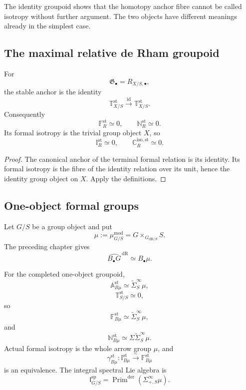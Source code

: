 \begin{remark}
The identity groupoid shows that the homotopy anchor fibre cannot be called
isotropy without further argument.  The two objects have different meanings
already in the simplest case.
\end{remark}

\subsection{The maximal relative de Rham groupoid}

\begin{proposition}
\label{prop:bnla-maximal-relation}
For
\[
    \mathfrak G_\bullet=R_{X/S,\bullet},
\]
the stable anchor is the identity
\[
    \mathbb T^{\mathrm{st}}_{X/S}
    \xrightarrow{\operatorname{id}}
    \mathbb T^{\mathrm{st}}_{X/S}.
\]
Consequently
\[
    \mathbb F^{\mathrm{st}}_R\simeq0,
    \qquad
    \mathbb N^{\mathrm{st}}_R\simeq0.
\]
Its formal isotropy is the trivial group object $X$, so
\[
    \mathbb I^{\mathrm{st}}_R\simeq0,
    \qquad
    \mathbb C^{\mathrm{iso,st}}_R\simeq0.
\]
\end{proposition}

\begin{proof}
The canonical anchor of the terminal formal relation is its identity.  Its
formal isotropy is the fibre of the identity relation over its unit, hence the
identity group object on $X$.  Apply the definitions.
\end{proof}

\subsection{One-object formal groups}

Let $G/S$ be a group object and put
\[
    \mu:=\mu^{\mathrm{mod}}_{G/S}
    =
    G\times_{G_{\mathrm{dR}/S}}S.
\]
The preceding chapter gives
\[
    \widehat{B_\bullet G}^{\,\mathrm{dR}}
    \simeq
    B_\bullet\mu.
\]

\begin{proposition}
\label{prop:bnla-one-object-differentiation}
For the completed one-object groupoid,
\[
    \mathbb A^{\mathrm{st}}_{B\mu}
    \simeq
    \widetilde\Sigma^\infty_S\mu,
\]
\[
    \mathbb T^{\mathrm{st}}_{S/S}\simeq0,
\]
so
\[
    \boxed{
    \mathbb F^{\mathrm{st}}_{B\mu}
    \simeq
    \widetilde\Sigma^\infty_S\mu,}
\]
and
\[
    \boxed{
    \mathbb N^{\mathrm{st}}_{B\mu}
    \simeq
    \Sigma\widetilde\Sigma^\infty_S\mu.}
\]
Actual formal isotropy is the whole arrow group $\mu$, and
\[
    \gamma^{\mathrm{st}}_{B\mu}:
    \mathbb I^{\mathrm{st}}_{B\mu}
    \xrightarrow{\sim}
    \mathbb F^{\mathrm{st}}_{B\mu}
\]
is an equivalence.  The integral spectral Lie algebra is
\[
    \boxed{
    \mathfrak l^{\mathrm{sp}}_{G/S}
    =
    \operatorname{Prim}^{\mathrm{der}}
    \left(
        \Sigma^\infty_{+,S}\mu
    \right).}
\]
\end{proposition}

